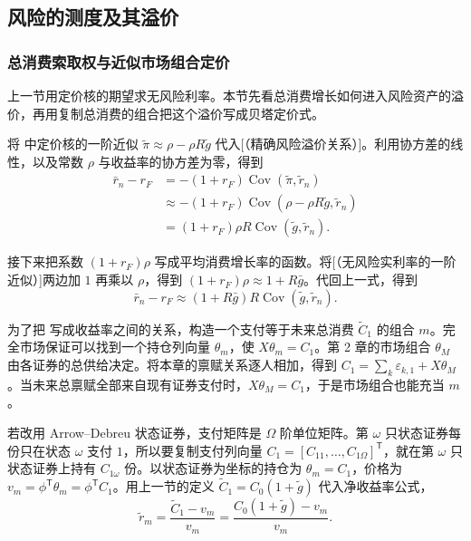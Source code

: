 \subsection{风险的测度及其溢价}
\subsubsection{总消费索取权与近似市场组合定价}
上一节用定价核的期望求无风险利率。本节先看总消费增长如何进入风险资产的溢价，再用复制总消费的组合把这个溢价写成贝塔定价式。

将 中定价核的一阶近似 $\widetilde\pi\approx\rho-\rho R\tilde g$ 代入[（精确风险溢价关系）]。利用协方差的线性，以及常数 $\rho$ 与收益率的协方差为零，得到
\[
 \begin{aligned}
 \bar r_n-r_F&=-(1+r_F)\operatorname{Cov}(\widetilde\pi,\tilde r_n)\\
 &\approx -(1+r_F)\operatorname{Cov}(\rho-\rho R\tilde g,\tilde r_n)\\
 &=(1+r_F)\rho R\operatorname{Cov}(\tilde g,\tilde r_n).
 \end{aligned}
\]

接下来把系数 $(1+r_F)\rho$ 写成平均消费增长率的函数。将[（无风险实利率的一阶近似）]两边加 $1$ 再乘以 $\rho$，得到 $(1+r_F)\rho\approx 1+R\bar g$。代回上一式，得到
\begin{equation*}
 \bar r_n-r_F\approx(1+R\bar g)R\operatorname{Cov}(\tilde g,\tilde r_n).
 \tag{$*$}\label{eq:wj-10-risk-growth-star}
\end{equation*}

为了把 写成收益率之间的关系，构造一个支付等于未来总消费 $\widetilde C_1$ 的组合 $m$。完全市场保证可以找到一个持仓列向量 $\theta_m$，使 $X\theta_m=C_1$。第 2 章的市场组合 $\theta_M$ 由各证券的总供给决定。将本章的禀赋关系逐人相加，得到 $C_1=\sum_k\varepsilon_{k,1}+X\theta_M$。当未来总禀赋全部来自现有证券支付时，$X\theta_M=C_1$，于是市场组合也能充当 $m$。

若改用 Arrow--Debreu 状态证券，支付矩阵是 $\Omega$ 阶单位矩阵。第 $\omega$ 只状态证券每份只在状态 $\omega$ 支付 $1$，所以要复制支付列向量 $C_1=[C_{11},\ldots,C_{1\Omega}]^{\mathsf T}$，就在第 $\omega$ 只状态证券上持有 $C_{1\omega}$ 份。以状态证券为坐标的持仓为 $\theta_m=C_1$，价格为 $v_m=\phi^{\mathsf T}\theta_m=\phi^{\mathsf T}C_1$。用上一节的定义 $\widetilde C_1=C_0(1+\tilde g)$ 代入净收益率公式，
\[
 \tilde r_m=\frac{\widetilde C_1-v_m}{v_m}
 =\frac{C_0(1+\tilde g)-v_m}{v_m}.
\]


